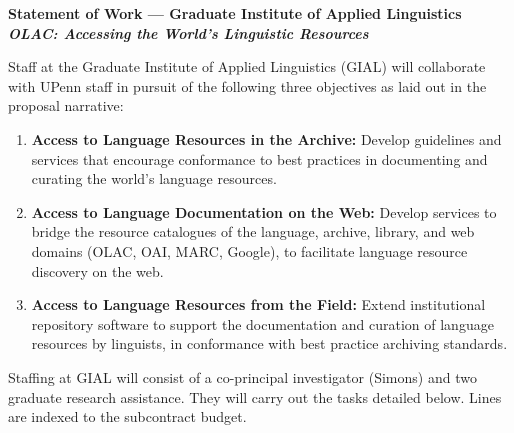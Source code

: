 \documentclass[11pt]{nsf}
\begin{document}
\begin{center}\textbf{\Large
Statement of Work --- Graduate Institute of Applied Linguistics \\[2ex]
\itshape{OLAC: Accessing the World's Linguistic Resources}\\[2ex]
}\end{center}

Staff at the Graduate Institute of Applied Linguistics (GIAL) will
collaborate with UPenn staff in pursuit of the following three
objectives as laid out in the proposal narrative:

\begin{enumerate}
\item \textbf{Access to Language Resources in the Archive:}
  Develop guidelines and services that encourage conformance to best
  practices in documenting and curating the world's language resources.
\item \textbf{Access to Language Documentation on the Web:}
  Develop services to bridge the resource catalogues of the
  language, archive, library, and web domains (OLAC, OAI, MARC,
  Google), to facilitate language resource discovery on the web.
\item \textbf{Access to Language Resources from the Field:}
  Extend institutional repository software to support the
  documentation and curation of language resources by linguists,
  in conformance with best practice archiving standards.
\end{enumerate}

Staffing at GIAL will consist of a co-principal investigator (Simons)
and two graduate research assistance.  They will carry out the tasks
detailed below.  Lines are indexed to the subcontract budget.
\end{document}

